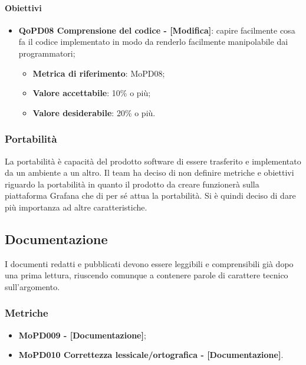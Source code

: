 \documentclass[../piano-di-qualifica.tex]{subfiles}
\begin{document}
\paragraph{Obiettivi}
\label{sub:obiettivi}
\begin{itemize}
    \item \textbf{QoPD08 Comprensione del codice - [Modifica]}: capire facilmente cosa fa il codice implementato in modo da renderlo facilmente manipolabile dai programmatori;
        \begin{itemize}
            \item \textbf{Metrica di riferimento}: MoPD08;
            \item \textbf{Valore accettabile}: 10\% o più;
            \item \textbf{Valore desiderabile}: 20\% o più.
        \end{itemize}
\end{itemize}


\subsubsection{Portabilità}%
\label{sub:portabilita}
La portabilità è capacità del prodotto software di essere trasferito e implementato da un ambiente a un altro.
Il team ha deciso di non definire metriche e obiettivi riguardo la portabilità in quanto il prodotto da creare funzionerà sulla piattaforma Grafana che di per sé attua la portabilità.
Si è quindi deciso di dare più importanza ad altre caratteristiche.

\subsection{Documentazione}%
\label{sub:documentazione}
I documenti redatti e pubblicati devono essere leggibili e comprensibili già dopo una prima lettura, riuscendo comunque a contenere parole di carattere tecnico sull'argomento.

\subsubsection{Metriche}
\label{sub:metriche}
\begin{itemize}
    \item \textbf{MoPD009  - [Documentazione]};
    \item \textbf{MoPD010 Correttezza lessicale/ortografica - [Documentazione]}.
\end{itemize}
\end{document}
